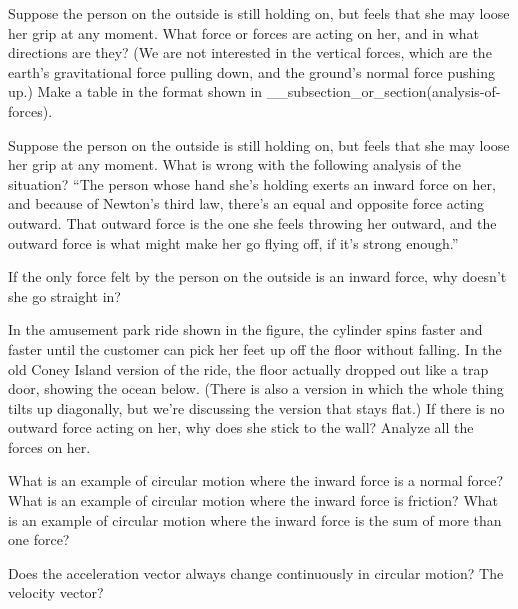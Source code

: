 \begin{dq}
Suppose the person on the outside is still holding on,
but feels that she may loose her grip at any moment.  What
force or forces are acting on her, and in what directions
are they?  (We are not interested in the vertical forces,
which are the earth's gravitational force pulling down, and
the ground's normal force pushing up.)
Make a table in the format shown in __subsection_or_section(analysis-of-forces).
\end{dq}

\begin{dq}
Suppose the person on the outside is still holding on,
but feels that she may loose her grip at any moment.  What
is wrong with the following analysis of the situation?
``The person whose hand she's holding exerts an inward force
on her, and because of Newton's third law, there's an equal
and opposite force acting outward.  That outward force is
the one she feels throwing her outward, and the outward
force is what might make her go flying off, if it's strong enough.''
\end{dq}

\begin{dq}\label{dq:crack-the-whip-4}
If the only force felt by the person on the outside is an
inward force, why doesn't she go straight in?
\end{dq}

\begin{dq}\label{dq:tilt-a-whirl}
In the amusement park ride shown in the figure, the
cylinder spins faster and faster until the customer can pick
her feet up off the floor without falling. In the old Coney
Island version of the ride, the floor actually dropped out
like a trap door, showing the ocean below. (There is also a
version in which the whole thing tilts up diagonally, but
we're discussing the version that stays flat.) If there is
no outward force acting on her, why does she stick to the
wall? Analyze all the forces on her.
\end{dq}

\begin{dq}
What is an example of circular motion where the inward
force is a normal force?  What is an example of circular
motion where the inward force is friction?  What is an
example of circular motion where the inward force is the sum
of more than one force?
\end{dq}

\begin{dq}
Does the acceleration vector always change continuously
in circular motion? The velocity vector?
\end{dq}

